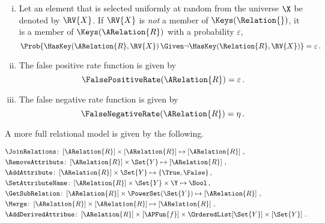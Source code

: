 \documentclass[ ../main.tex]{subfiles}
\begin{document}
\begin{definition}
\begin{enumerate}[(i)]
    \item Let an element that is selected uniformly at random from the universe $\X$ be denoted by $\RV{X}$. If $\RV{X}$ is \emph{not} a member of $\Keys(\Relation{})$, it is a member of $\Keys(\ARelation{R})$ with a probability $\varepsilon$,
    \begin{equation}
        \Prob{\HasKey\!\left(\ARelation{R},\RV{X}\right) \Given \neg \HasKey\!\left(\Relation{R},\RV{X}\right)} = \varepsilon\,.
    \end{equation}
    
    \item The false positive rate function is given by
    \begin{equation}
         \FalsePositiveRate(\ARelation{R}) = \varepsilon\,.
    \end{equation}

    \item The false negative rate function is given by
    \begin{equation}
         \FalseNegativeRate(\ARelation{R}) = \eta\,.
    \end{equation}    

\end{enumerate}
\end{definition}


A more full relational model is given by the following.
\begin{definition}
\begin{align}
    &\JoinRelations \colon \left[\ARelation{R}\right] \times \left[\ARelation{R}\right] \mapsto \left[\ARelation{R}\right]\,,\\
    &\RemoveAttribute \colon \left[\ARelation{R}\right] \times \Set{Y} \mapsto \left[\ARelation{R}\right]\,,\\
    &\AddAttribute \colon \left[\ARelation{R}\right] \times \Set{Y} \mapsto \{\True,\False\}\,,\\
    &\SetAttributeName \colon \left[\ARelation{R}\right] \times \Set{Y} \times \Y \mapsto \Bool\,,\\
    &\GetSubRelation \colon \left[\ARelation{R}\right] \times \PowerSet(\Set{Y}) \mapsto \left[\ARelation{R}\right]\,,\\
    &\Merge \colon \left[\ARelation{R}\right] \times \left[\ARelation{R}\right] \mapsto \left[\ARelation{R}\right]\,,\\
    &\AddDerivedAttribue \colon \left[\ARelation{R}\right] \times \left[\APFun{f}\right] \times \OrderedList[\Set{Y}] \times \left[\Set{Y}\right]\,.
\end{align}
\end{definition}
\end{document}
